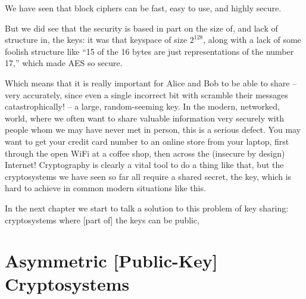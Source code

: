 \documentclass[12pt,letterpaper]{amsbook}
\theoremstyle{definition}
\theoremstyle{remark}
\numberwithin{figure}{section}
\numberwithin{exercise}{chapter}
\numberwithin{section}{chapter}
\numberwithin{equation}{section}
\numberwithin{table}{subsection}
\newcommand{\ix}[1]{{#1}\index{#1}}
\begin{document}
\vskip3mm
We have seen that block ciphers can be fast, easy to use, and highly secure.

But we did see that the security is based in part on the size of, and lack of
structure in, the \ix{key}s: it was that \ix{keyspace} of size $2^128$, along
with a lack of some foolish structure like ``15 of the 16 bytes are just
representations of the number 17,'' which made AES so secure.

Which means that it is really important for Alice and Bob to be able to share
-- very accurately, since even a single incorrect bit with scramble their
messages catastrophically! -- a large, random-seeming \ix{key}.  In the modern,
networked,  world, where we often want to share valuable information very
securely with people whom we may have never met in person, this is a serious
defect.  You may want to get your credit card number to an online store from
your laptop, first through the open WiFi at a coffee shop, then across the
(insecure by design) Internet!  Cryptography is clearly a vital tool to do a
thing like that, but the cryptosystems we have seen so far all require a
shared secret, the \ix{key}, which is hard to achieve in common modern
situations like this.

In the next chapter we start to talk a solution to this problem of \ix{key}
sharing: cryptosystems where [part of] the \ix{key}s can be public,

\chapter{Asymmetric [Public-Key] Cryptosystems}\label{chap:asymmetricCSs}
\end{document}
